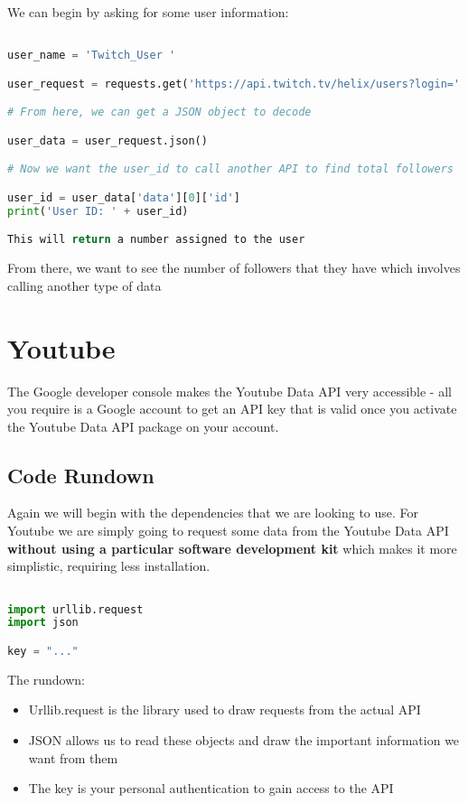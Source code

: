 \documentclass[12pt, letterpaper]{article}
\begin{document}
We can begin by asking for some user information:
\begin{lstlisting}[language=python]

user_name = 'Twitch_User '

user_request = requests.get('https://api.twitch.tv/helix/users?login=' + user_name, headers={"Client-ID": "..."}

# From here, we can get a JSON object to decode

user_data = user_request.json()

# Now we want the user_id to call another API to find total followers

user_id = user_data['data'][0]['id']
print('User ID: ' + user_id)

This will return a number assigned to the user

\end{lstlisting}
From there, we want to see the number of followers that they have which involves calling another type of data 


\newpage
\section{Youtube}
The Google developer console makes the Youtube Data API very accessible - all you require is a Google account to get an API key that is valid once you activate the Youtube Data API package on your account.
\subsection{Code Rundown}
Again we will begin with the dependencies that we are looking to use. For Youtube we are simply going to request some data from the Youtube Data API \textbf{without using a particular software development kit} which makes it more simplistic, requiring less installation.

\begin{lstlisting}[language=python]

import urllib.request
import json

key = "..."
\end{lstlisting}

The rundown:
\begin{itemize}
	\item Urllib.request is the library used to draw requests from the actual API
	\item JSON allows us to read these objects and draw the important information we want from them
	\item The key is your personal authentication to gain access to the API
\end{itemize}
\end{document}
